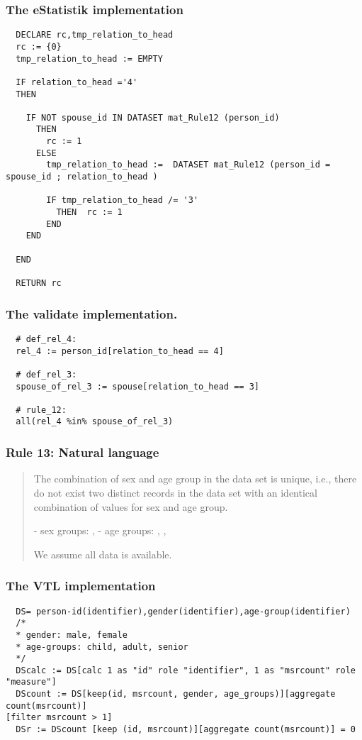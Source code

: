 \subsubsection*{The eStatistik implementation}
\begin{verbatim}
  DECLARE rc,tmp_relation_to_head
  rc := {0}
  tmp_relation_to_head := EMPTY

  IF relation_to_head ='4'
  THEN   

    IF NOT spouse_id IN DATASET mat_Rule12 (person_id)
      THEN
        rc := 1
      ELSE
        tmp_relation_to_head :=  DATASET mat_Rule12 (person_id = spouse_id ; relation_to_head )

        IF tmp_relation_to_head /= '3'
          THEN  rc := 1
        END
    END

  END
  
  RETURN rc
\end{verbatim}
\subsubsection*{The validate implementation.}
\begin{verbatim}
  # def_rel_4:
  rel_4 := person_id[relation_to_head == 4]

  # def_rel_3:
  spouse_of_rel_3 := spouse[relation_to_head == 3]

  # rule_12:
  all(rel_4 %in% spouse_of_rel_3)
\end{verbatim}


\newpage

\subsubsection*{  Rule 13: Natural language}
\begin{quote}


The combination of sex and age group in the data set is unique, i.e., there do not exist two distinct records in
the data set with an identical combination of values for sex and age group.

- sex groups: , 
- age groups: , ,  

We assume all data is available.


\end{quote}
\subsubsection*{The VTL implementation}
\begin{verbatim}
  DS= person-id(identifier),gender(identifier),age-group(identifier)
  /*
  * gender: male, female
  * age-groups: child, adult, senior
  */
  DScalc := DS[calc 1 as "id" role "identifier", 1 as "msrcount" role "measure"]
  DScount := DS[keep(id, msrcount, gender, age_groups)][aggregate count(msrcount)]
[filter msrcount > 1]
  DSr := DScount [keep (id, msrcount)][aggregate count(msrcount)] = 0
\end{verbatim}
